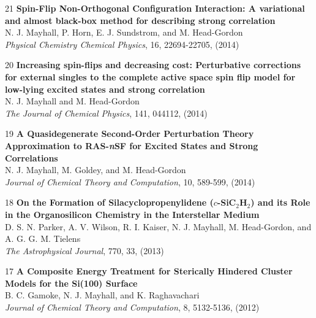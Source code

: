 \documentclass[10pt]{article}
\newenvironment{lonelist}[1][\enskip\textbullet]%
        {\vspace{-\baselineskip}\begin{list}{#1}{%
        \setlength{\partopsep}{0pt}%
        \setlength{\topsep}{0pt}}}
        {\end{list}\vspace{-.6\baselineskip}}
\def\Vhrulefill{\leavevmode\leaders\hrule height 0.7ex depth \dimexpr0.4pt-0.7ex\hfill\kern0pt}
\begin{document}
\begin{lonelist}
%
\item[21\hspace{4pt}] \textbf{Spin-Flip Non-Orthogonal Configuration Interaction: A variational and almost black-box method for describing strong correlation}\\
N. J. Mayhall, P. Horn, E. J. Sundstrom, and M. Head-Gordon\\
\textsl{Physical Chemistry Chemical Physics}, 16, 22694-22705, (2014)


\item[20\hspace{4pt}] \textbf{Increasing spin-flips and decreasing cost: Perturbative corrections for external singles to the complete
		active space spin flip model for low-lying excited states and strong correlation}\\
N. J. Mayhall and M. Head-Gordon\\
\textsl{The Journal of Chemical Physics}, 141, 044112, (2014)

\item[19\hspace{4pt}] \textbf{A Quasidegenerate Second-Order Perturbation Theory Approximation to RAS-\textsl{n}SF for Excited States and Strong Correlations}\\
N. J. Mayhall, M. Goldey, and M. Head-Gordon\\
\textsl{Journal of Chemical Theory and Computation}, 10, 589-599, (2014)

\item[18\hspace{4pt}] \textbf{On the Formation of Silacyclopropenylidene ($c$-SiC$_2$H$_2$) and its Role in the Organosilicon Chemistry in the Interstellar Medium}\\
D. S. N. Parker, A. V. Wilson, R. I. Kaiser, N. J. Mayhall, M. Head-Gordon, and A. G. G. M. Tielens\\
\textsl{The Astrophysical Journal}, 770, 33, (2013)

\item[17\hspace{4pt}] \textbf{A Composite Energy Treatment for Sterically Hindered Cluster Models for the Si(100) Surface}\\
B. C. Gamoke, N. J. Mayhall, and K. Raghavachari \\
\textsl{Journal of Chemical Theory and Computation}, 8, 5132-5136, (2012)


\end{lonelist}
\end{document}
